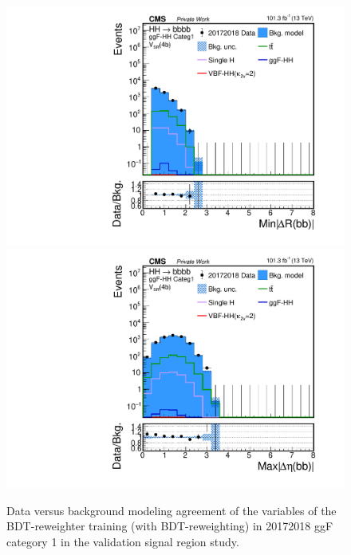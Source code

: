 \begin{figure}[htbp!]
\begin{center}
\includegraphics[width=0.24\linewidth]{Figures/Modeling/background/plotsDatadrivenWithBDT/20172018/GGFcateg1_SR_210/Histogram/plot20172018_min_4b_deltaR_Btag4_GGFcateg1_SR_210_Histogram_log.pdf}
\includegraphics[width=0.24\linewidth]{Figures/Modeling/background/plotsDatadrivenWithBDT/20172018/GGFcateg1_SR_210/Histogram/plot20172018_max_4b_deltaEta_Btag4_GGFcateg1_SR_210_Histogram_log.pdf}
\end{center}
\caption{Data versus background modeling agreement of the variables of the BDT-reweighter training (with BDT-reweighting) in 20172018 ggF category 1 in the validation signal region study.}
\label{bkg:fig:valsrbdtregvarggf1_20172018}
\end{figure}

